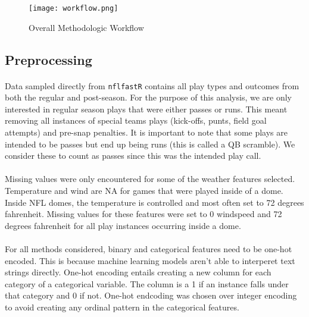 \documentclass[11pt]{article}
\begin{document}
        \begin{figure}[ht]
            \texttt{[image: workflow.png]}
            \caption{Overall Methodologic Workflow }
            \label{fig:boat1}
        \end{figure}
        \begin{multicols*}{2}

        \subsection{Preprocessing}
            \paragraph{}
                Data sampled directly from \texttt{nflfastR} contains all play types and outcomes from both the regular and post-season. 
                For the purpose of this analysis, we are only interested in regular season plays that were either passes or runs. 
                This meant removing all instances of special teams plays (kick-offs, punts, field goal attempts) and pre-snap penalties. 
                It is important to note that some plays are intended to be passes but end up being runs (this is called a QB scramble). 
                We consider these to count as passes since this was the intended play call.   
            
            \vspace{-10pt}

            \paragraph{}
                Missing values were only encountered for some of the weather features selected.
                Temperature and wind are NA for games that were played inside of a dome. 
                Inside NFL domes, the temperature is controlled and most often set to 72 degrees fahrenheit.
                Missing values for these features were set to 0 windspeed and 72 degrees fahrenheit for all play instances occurring inside a dome. 
            
            \vspace{-10pt}

            \paragraph{}
                For all methods considered, binary and categorical features need to be one-hot encoded.
                This is because machine learning models aren't able to interperet text strings directly. 
                One-hot encoding entails creating a new column for each category of a categorical variable. 
                The column is a 1 if an instance falls under that category and 0 if not. 
                One-hot endcoding was chosen over integer encoding to avoid creating any ordinal pattern in the categorical features. 


\end{multicols*}
\end{document}
